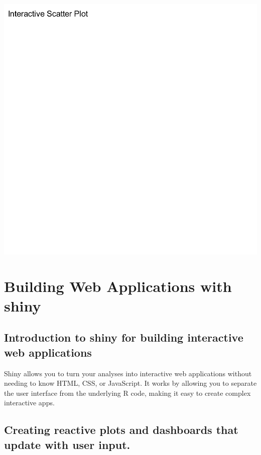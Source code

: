 \documentclass[
]{book}
\begin{document}
\includegraphics{_main_files/figure-latex/unnamed-chunk-91-1.pdf}

\section{Building Web Applications with shiny}\label{building-web-applications-with-shiny}

\subsection{Introduction to shiny for building interactive web applications}\label{introduction-to-shiny-for-building-interactive-web-applications}

Shiny allows you to turn your analyses into interactive web applications without needing to know HTML, CSS, or JavaScript. It works by allowing you to separate the user interface from the underlying R code, making it easy to create complex interactive apps.

\subsection{Creating reactive plots and dashboards that update with user input.}\label{creating-reactive-plots-and-dashboards-that-update-with-user-input.}
\end{document}
